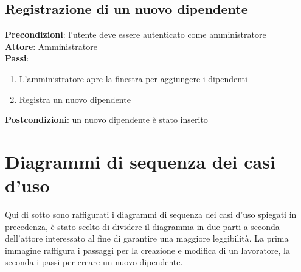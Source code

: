 \documentclass[ 4paper,11pt,openany]{book}
\begin{document}
\subsection{Registrazione di un nuovo dipendente}
\textbf{Precondizioni}: l'utente deve essere autenticato come amministratore\\
\textbf{Attore}: Amministratore\\
\textbf{Passi}:
\begin{enumerate}
\item L'amministratore apre la finestra per aggiungere i dipendenti 
\item Registra un nuovo dipendente
\end{enumerate}
\textbf{Postcondizioni}: un nuovo dipendente è stato inserito\\

\section{Diagrammi di sequenza dei casi d'uso}
Qui di sotto sono raffigurati i diagrammi di sequenza dei casi d'uso spiegati in precedenza, è stato scelto di dividere il diagramma in due parti a seconda dell'attore interessato al fine di garantire una maggiore leggibilità. La prima immagine raffigura i passaggi per la creazione e modifica di un lavoratore, la seconda i passi per creare un nuovo dipendente.
\end{document}
